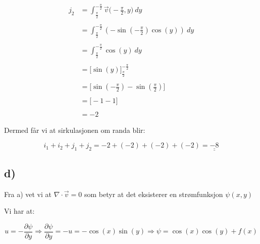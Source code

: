 \documentclass{article}
\newcommand{\answer}[1]{\underline{\underline{#1}}}
\begin{document}
\begin{flushle}
\begin{multicols}{2}
\begin{align*}
j_2 & = \int_{\frac{\pi}{2}}^{-\frac{\pi}{2}}\vec{v}\bigg(-\frac{\pi}{2}, y\bigg) \ dy \\ \\
 & = \int_{\frac{\pi}{2}}^{-\frac{\pi}{2}} (-\sin{(-\frac{\pi}{2})}\cos{(y)}) \ dy \\ \\
 & = \int_{\frac{\pi}{2}}^{-\frac{\pi}{2}} \cos{(y)} \ dy \\ \\
 & = \bigg[ \sin{(y)} \bigg]_{\frac{\pi}{2}}^{-\frac{\pi}{2}} \\ \\
 & = \bigg[ \sin{(-\frac{\pi}{2})} - \sin{(\frac{\pi}{2})} \bigg] \\ \\
 & = \bigg[ -1-1 \bigg] \\ \\
 & = -2
\end{align*}
\end{multicols}

\bigskip

\begin{flushleft}
Dermed får vi at sirkulasjonen om randa blir:
\end{flushleft}

\begin{equation*}
i_1 + i_2 + j_1 + j_2 = -2 + (-2) + (-2) + (-2) = \answer{-8}
\end{equation*}

\newpage

%
%

\subsection*{d)}

\begin{flushleft}
Fra a) vet vi at \(\nabla \cdot \vec{v} = 0\) som betyr at det eksisterer en strømfunksjon \(\psi(x,y)\)
\end{flushleft}

\begin{flushleft}
Vi har at:
\end{flushleft}

\begin{equation*}
u = -\frac{\partial \psi}{\partial y} \Rightarrow \frac{\partial \psi}{\partial y} = -u = -\cos{(x)}\sin{(y)} \Rightarrow \psi = \cos{(x)}\cos{(y)} + f(x)
\end{equation*}


\end{flushle}
\end{document}
